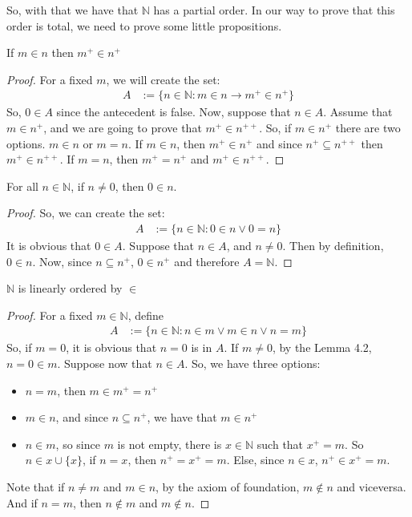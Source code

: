 \documentclass{tufte-handout}
\begin{document}
So, with that we have that $\mathbb{N}$ has a partial order. In our way to prove that this order is total, we need to prove some little propositions.

\begin{lemma}
	If $m \in n$ then $m^+ \in n^+$
\end{lemma}
\begin{proof}
	For a fixed $m$, we will create the set:
	\begin{align*}
		A&:= \{n \in \mathbb{N}: m \in n \rightarrow m^+ \in n^+\}
	\end{align*}
	So, $0 \in A$ since the antecedent is false. Now, suppose that $n \in A$. Assume that $m \in n^+$, and we are going to prove that $m^+ \in n^{++}$. So, if $m \in n^+$ there are two options. $m \in n$ or $m = n$. If $m \in n$, then $m^+ \in n^+$ and since $n^+ \subseteq n^{++}$ then $m^+ \in n^{++}$. If $m = n$, then $m^+ = n^+$ and $m^+ \in n^{++}$.
\end{proof}

\begin{lemma}
	For all $n \in \mathbb{N}$, if $n \neq 0$, then $0 \in n$.
\end{lemma}
\begin{proof}
	So, we can create the set:
	\begin{align*}
		A &:= \{n \in \mathbb{N}: 0 \in n \vee 0 = n\}
	\end{align*}
	It is obvious that $0 \in A$. Suppose that $n \in A$, and $n \neq 0$. Then by definition, $0 \in n$. Now, since $n \subseteq n^+$, $0 \in n^+$ and therefore $A = \mathbb{N}$.
\end{proof}

\begin{theorem}
	$\mathbb{N}$ is linearly ordered by $\in$
\end{theorem}
\begin{proof}
	For a fixed $m \in \mathbb{N}$, define
	\begin{align*}
		A &:= \{n \in \mathbb{N}: n \in m \vee m \in n \vee n = m\}
	\end{align*}
	So, if $m = 0$, it is obvious that $n = 0$ is in $A$. If $m \neq 0$, by the Lemma 4.2, $n = 0 \in m$. Suppose now that $n \in A$. So, we have three options:
	\begin{itemize}
		\item $n = m$, then $m \in m^+ = n^+$
		\item $m \in n$, and since $n \subseteq n^+$, we have that $m \in n^+$
		\item $n \in m$, so since $m$ is not empty, there is $x \in \mathbb{N}$ such that $x^+ = m$. So $n \in x \cup \{x\}$, if $ n = x$, then $n^+ = x^+ = m$. Else, since $n \in x$, $n^+ \in x^+ = m$.
	\end{itemize}
	Note that if $n \neq m$ and $m \in n$, by the axiom of foundation, $m \not\in n$ and viceversa. And if $n = m$, then $n \not\in m$ and $m\not\in n$.
\end{proof}
\end{document}
